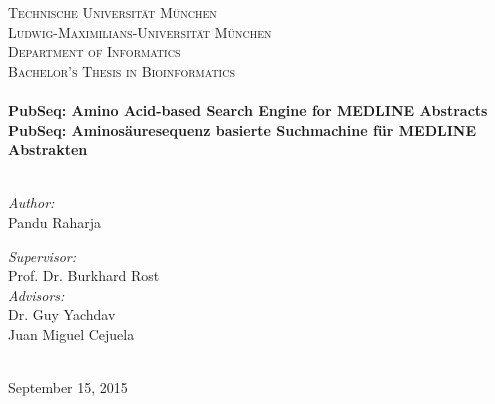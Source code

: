 \documentclass[12pt, twoside]{Thesis} %
\begin{document}
\begin{titlepage}
\begin{center}

\textsc{\Large Technische Universit\"at M\"unchen}\\[.5cm] %
\textsc{\Large Ludwig-Maximilians-Universit\"at M\"unchen}\\[1.5cm] %
\textsc{\Large Department of Informatics}\\[1.5cm] %
\textsc{\Large Bachelor's Thesis in Bioinformatics}\\[0.5cm] %

\HRule \\[0.4cm] %
{\Large \bfseries PubSeq: Amino Acid-based Search Engine for MEDLINE Abstracts}\\[0.4cm] %
{\Large \bfseries PubSeq: Aminosäuresequenz basierte Suchmachine für MEDLINE Abstrakten}\\[0.4cm] %
\HRule \\[1.5cm] %
 
\begin{minipage}{0.4\textwidth}
\begin{flushleft} \large
\emph{Author:}\\
Pandu Raharja
\end{flushleft}
\end{minipage}
\begin{minipage}{0.4\textwidth}
\begin{flushright} \large
\emph{Supervisor:} \\
Prof. Dr. Burkhard Rost\\
\emph{Advisors:} \\
Dr. Guy Yachdav \\
Juan Miguel Cejuela
\end{flushright}
\end{minipage}\\[3cm]
 
 
{\large September 15, 2015}\\[4cm] %
 
\vfill
\end{center}

\end{titlepage}
\end{document}
